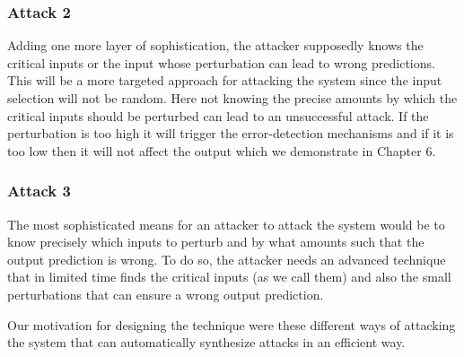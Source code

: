 \subsubsection{Attack 2}
Adding one more layer of sophistication, the attacker supposedly knows the critical inputs or the input whose perturbation can lead to wrong predictions. This will be a more targeted approach for attacking the system since the input selection will not be random. 
Here not knowing the precise amounts by which the critical inputs should be perturbed can lead to an unsuccessful attack. 
If the perturbation is too high it will trigger the error-detection mechanisms and if it is too low then it will not affect the output which we demonstrate  in Chapter 6. 
\subsubsection{Attack 3}
The most sophisticated means for an attacker to attack the system would be to know precisely which inputs to perturb and by what amounts such that the output prediction is wrong. 
To do so, the attacker needs an advanced technique that in limited time finds the critical inputs (as we call them) and also the small perturbations that can ensure a wrong output prediction. 


Our motivation for designing the technique were these different ways of attacking the system that can automatically synthesize attacks in an efficient way. 













